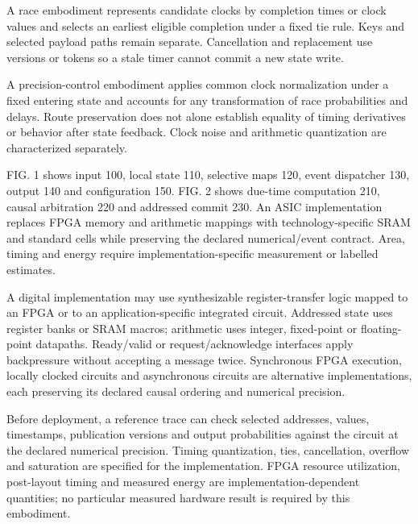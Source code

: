 \documentclass[pct]{sm-patent}
\begin{document}
\pnum A race embodiment represents candidate clocks by completion times or clock values and selects an earliest eligible completion under a fixed tie rule. Keys and selected payload paths remain separate. Cancellation and replacement use versions or tokens so a stale timer cannot commit a new state write.

\pnum A precision-control embodiment applies common clock normalization under a fixed entering state and accounts for any transformation of race probabilities and delays. Route preservation does not alone establish equality of timing derivatives or behavior after state feedback. Clock noise and arithmetic quantization are characterized separately.

\pnum FIG. 1 shows input 100, local state 110, selective maps 120, event dispatcher 130, output 140 and configuration 150. FIG. 2 shows due-time computation 210, causal arbitration 220 and addressed commit 230. An ASIC implementation replaces FPGA memory and arithmetic mappings with technology-specific SRAM and standard cells while preserving the declared numerical/event contract. Area, timing and energy require implementation-specific measurement or labelled estimates.


\pnum A digital implementation may use synthesizable register-transfer logic mapped to an FPGA or to an application-specific integrated circuit. Addressed state uses register banks or SRAM macros; arithmetic uses integer, fixed-point or floating-point datapaths. Ready/valid or request/acknowledge interfaces apply backpressure without accepting a message twice. Synchronous FPGA execution, locally clocked circuits and asynchronous circuits are alternative implementations, each preserving its declared causal ordering and numerical precision.

\pnum Before deployment, a reference trace can check selected addresses, values, timestamps, publication versions and output probabilities against the circuit at the declared numerical precision. Timing quantization, ties, cancellation, overflow and saturation are specified for the implementation. FPGA resource utilization, post-layout timing and measured energy are implementation-dependent quantities; no particular measured hardware result is required by this embodiment.

\claimsstart
\end{document}
